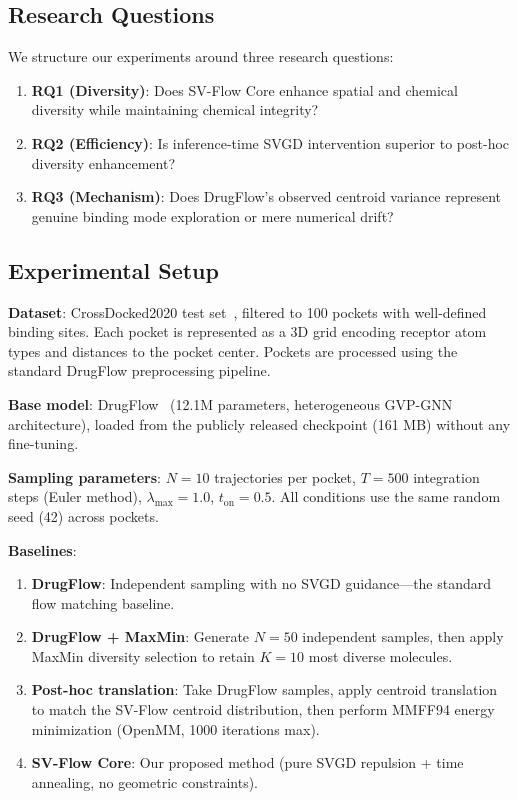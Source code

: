 \documentclass[a4paper,11pt]{article}
\begin{document}
\subsection{Research Questions}

We structure our experiments around three research questions:

\begin{enumerate}
  \item \textbf{RQ1 (Diversity)}: Does SV-Flow Core enhance spatial and chemical
    diversity while maintaining chemical integrity?
  \item \textbf{RQ2 (Efficiency)}: Is inference-time SVGD intervention superior
    to post-hoc diversity enhancement?
  \item \textbf{RQ3 (Mechanism)}: Does DrugFlow's observed centroid variance
    represent genuine binding mode exploration or mere numerical drift?
\end{enumerate}

\subsection{Experimental Setup}

\textbf{Dataset}: CrossDocked2020 test set~\cite{crossdocked2020}, filtered to
100 pockets with well-defined binding sites.  Each pocket is represented as a 3D
grid encoding receptor atom types and distances to the pocket center.  Pockets
are processed using the standard DrugFlow preprocessing pipeline.

\textbf{Base model}: DrugFlow~\cite{drugflow2024} (12.1M parameters,
heterogeneous GVP-GNN architecture), loaded from the publicly released
checkpoint (161 MB) without any fine-tuning.

\textbf{Sampling parameters}: $N = 10$ trajectories per pocket, $T = 500$
integration steps (Euler method), $\lambda_{\text{max}} = 1.0$, $t_{\text{on}} =
0.5$.  All conditions use the same random seed (42) across pockets.

\textbf{Baselines}:
\begin{enumerate}
  \item \textbf{DrugFlow}: Independent sampling with no SVGD guidance---the
    standard flow matching baseline.
  \item \textbf{DrugFlow + MaxMin}: Generate $N = 50$ independent samples, then
    apply MaxMin diversity selection to retain $K = 10$ most diverse molecules.
  \item \textbf{Post-hoc translation}: Take DrugFlow samples, apply centroid
    translation to match the SV-Flow centroid distribution, then perform MMFF94
    energy minimization (OpenMM, 1000 iterations max).
  \item \textbf{SV-Flow Core}: Our proposed method (pure SVGD repulsion + time
    annealing, no geometric constraints).
\end{enumerate}
\end{document}
